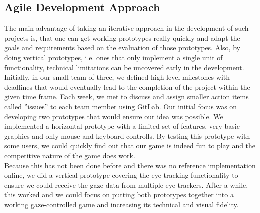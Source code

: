\documentclass{sigchi}
\begin{document}
\subsection{Agile Development Approach}
The main advantage of taking an iterative approach in the development of such projects is, that one can get working prototypes really quickly and adapt the goals and requirements based on the evaluation of those prototypes. Also, by doing vertical prototypes, i.e. ones that only implement a single unit of functionality, technical limitations can be uncovered early in the development.\\
Initially, in our small team of three, we defined high-level milestones with deadlines that would eventually lead to the completion of the project within the given time frame. Each week, we met to discuss and assign smaller action items called ''issues'' to each team member using GitLab. Our initial focus was on developing two prototypes that would ensure our idea was possible. We implemented a horizontal prototype with a limited set of features, very basic graphics and only mouse and keyboard controlls. By testing this prototype with some users, we could quickly find out that our game is indeed fun to play and the competitive nature of the game does work.\\
Because this has not been done before and there was no reference implementation online, we did a vertical prototype covering the eye-tracking functionality to ensure we could receive the gaze data from multiple eye trackers. After a while, this worked and we could focus on putting both prototypes together into a working gaze-controlled game and increasing its technical and visual fidelity.
\end{document}

